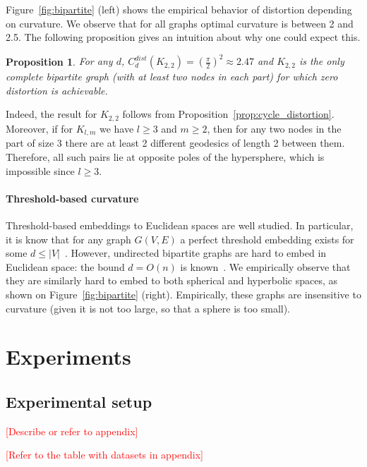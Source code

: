 \documentclass{article} %
\newtheorem{proposition}[theorem]{Proposition}
\begin{document}
Figure~\ref{fig:bipartite} (left) shows the empirical behavior of distortion depending on curvature. We observe that for all graphs optimal curvature is between 2 and 2.5. 
The following proposition gives an intuition about why one could expect this. 

\begin{proposition}\label{prop:bipartite_distortion}
For any $d$, $C_d^{dist}(K_{2,2}) = \left(\frac{\pi}{2}\right)^2 \approx 2.47$ and $K_{2,2}$ is the only complete bipartite graph (with at least two nodes in each part) for which zero distortion is achievable.
\end{proposition}

Indeed, the result for $K_{2,2}$ follows from Proposition~\ref{prop:cycle_distortion}. Moreover, if for $K_{l,m}$ we have $l \ge 3$ and $m \ge 2$, then for any two nodes in the part of size 3 there are at least 2 different geodesics of length 2 between them. Therefore, all such pairs lie at opposite poles of the hypersphere, which is impossible since $l \ge 3$.

\paragraph{Threshold-based curvature} 
 
Threshold-based embeddings to Euclidean spaces are well studied. In particular, it is know that for any graph $G(V,E)$ a perfect threshold embedding  exists for some $d \le |V|$~\citep{maehara1984space}. 
However, undirected bipartite graphs are hard to embed in Euclidean space: the bound $d = O(n)$ is known~\citep{maehara1984space}. We empirically observe that they are similarly hard to embed to both spherical and hyperbolic spaces, as shown on Figure~\ref{fig:bipartite} (right). Empirically, these graphs are insensitive to curvature (given it is not too large, so that a sphere is too small).
 
\section{Experiments}

\subsection{Experimental setup}

\textcolor{red}{[Describe or refer to appendix]}

\textcolor{red}{[Refer to the table with datasets in appendix]}
\end{document}
